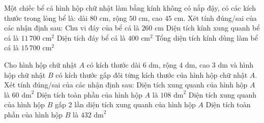 \begin{ex} %
Một chiếc bể cá hình hộp chữ nhật làm bằng kính không có nắp đậy, có các kích thước trong lòng bể là: dài $80\text{ cm}$, rộng $50\text{ cm}$, cao $45\text{ cm}$. Xét tính đúng/sai của các nhận định sau:
\choiceTF
{\True Chu vi đáy của bể cá là $260\text{ cm}$}
{\True Diện tích kính xung quanh bể cá là $11\,700\text{ cm}^2$}
{Diện tích đáy bể cá là $400\text{ cm}^2$}
{\True Tổng diện tích kính dùng làm bể cá là $15\,700\text{ cm}^2$}
\end{ex}

\begin{ex} %
Cho hình hộp chữ nhật $A$ có kích thước dài $6\text{ dm}$, rộng $4\text{ dm}$, cao $3\text{ dm}$ và hình hộp chữ nhật $B$ có kích thước gấp đôi từng kích thước của hình hộp chữ nhật $A$. Xét tính đúng/sai của các nhận định sau:
\choiceTF
{\True Diện tích xung quanh của hình hộp $A$ là $60\text{ dm}^2$}
{\True Diện tích toàn phần của hình hộp $A$ là $108\text{ dm}^2$}
{Diện tích xung quanh của hình hộp $B$ gấp $2$ lần diện tích xung quanh của hình hộp $A$}
{\True Diện tích toàn phần của hình hộp $B$ là $432\text{ dm}^2$}
\end{ex}

